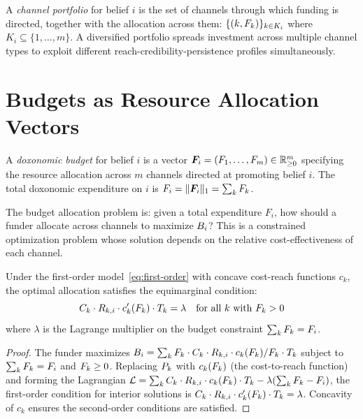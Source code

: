 \begin{definition}
\label{def:portfolio}
A \emph{channel portfolio} for belief $i$ is the set of channels through which funding is directed, together with the allocation across them: $\{(k, F_{k})\}_{k \in K_i}$ where $K_i \subseteq \{1, \ldots, m\}$.
A diversified portfolio spreads investment across multiple channel types to exploit different reach-credibility-persistence profiles simultaneously.
\end{definition}


\section{Budgets as Resource Allocation Vectors}
\label{sec:ch4-budgets}

\begin{definition}
\label{def:budget}
A \emph{doxonomic budget} for belief $i$ is a vector $\bm{F}_i = (F_{1}, \ldots, F_{m}) \in \mathbb{R}^m_{\geq 0}$ specifying the resource allocation across $m$ channels directed at promoting belief $i$.
The total doxonomic expenditure on $i$ is $F_i = \|\bm{F}_i\|_1 = \sum_k F_{k}$.
\end{definition}

The budget allocation problem is: given a total expenditure $F_i$, how should a funder allocate across channels to maximize $B_{i}$?
This is a constrained optimization problem whose solution depends on the relative cost-effectiveness of each channel.

\begin{proposition}
\label{prop:optimal-allocation}
Under the first-order model~\eqref{eq:first-order} with concave cost-reach functions $c_k$, the optimal allocation satisfies the equimarginal condition:
\[
  C_{k} \cdot R_{k,i} \cdot c_k'(F_{k}) \cdot T_{k} = \lambda \quad \text{for all } k \text{ with } F_{k} > 0
\]
where $\lambda$ is the Lagrange multiplier on the budget constraint $\sum_k F_{k} = F_i$.
\end{proposition}

\begin{proof}
The funder maximizes $B_{i} = \sum_k F_{k} \cdot C_{k} \cdot R_{k,i} \cdot c_k(F_{k}) / F_{k} \cdot T_{k}$ subject to $\sum_k F_{k} = F_i$ and $F_{k} \geq 0$.
Replacing $P_{k}$ with $c_k(F_{k})$ (the cost-to-reach function) and forming the Lagrangian $\mathcal{L} = \sum_k C_{k} \cdot R_{k,i} \cdot c_k(F_{k}) \cdot T_{k} - \lambda(\sum_k F_{k} - F_i)$, the first-order condition for interior solutions is $C_{k} \cdot R_{k,i} \cdot c_k'(F_{k}) \cdot T_{k} = \lambda$.
Concavity of $c_k$ ensures the second-order conditions are satisfied.
\end{proof}

